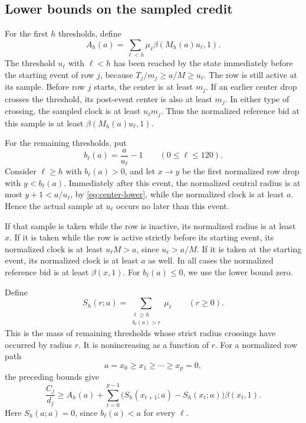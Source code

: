 \documentclass[11pt]{article}
\theoremstyle{definition}
\theoremstyle{remark}
\begin{document}
\subsection{Lower bounds on the sampled credit}

For the first $h$ thresholds, define
\begin{equation}\label{eq:active-credit}
  A_h(a)=\sum_{\ell<h}\mu_\ell\beta(M_h(a)u_\ell,1).
\end{equation}
The threshold $u_\ell$ with $\ell<h$ has been reached by the state
immediately before the starting event of row $j$, because
$T_j/m_j\ge a/M\ge u_\ell$.
The row is still active at its sample.
Before row $j$ starts, the center is at least $m_j$. If an earlier center drop
crosses the threshold, its post-event center is also at least $m_j$.
In either type of crossing, the sampled clock is at least $u_\ell m_j$.
Thus the normalized reference bid at this sample is at least
$\beta(M_h(a)u_\ell,1)$.

For the remaining thresholds, put
\begin{equation}\label{eq:threshold-radii}
  b_\ell(a)=\frac a{u_\ell}-1\qquad(0\le\ell\le120).
\end{equation}
Consider $\ell\ge h$ with $b_\ell(a)>0$, and let $x\longrightarrow y$ be the
first normalized row drop with $y<b_\ell(a)$.
Immediately after this event, the normalized central radius is at most
$y+1<a/u_\ell$, by \eqref{eq:center-lower}, while the normalized clock is
at least $a$. Hence the actual sample at $u_\ell$ occurs no later than this
event.

If that sample is taken while the row is inactive, its normalized radius is
at least $x$. If it is taken while the row is active strictly before
its starting event, its normalized clock is at least $u_\ell M>a$, since
$u_\ell>a/M$. If it is taken at the starting event, its normalized clock
is at least $a$ as well. In all cases the normalized reference bid is at
least $\beta(x,1)$. For $b_\ell(a)\le0$, we use the lower bound zero.

Define
\begin{equation}\label{eq:spent}
  S_h(r;a)=\sum_{\substack{\ell\ge h\\b_\ell(a)>r}}\mu_\ell
  \qquad(r\ge0).
\end{equation}
This is the mass of remaining thresholds whose strict radius crossings have
occurred by radius $r$. It is nonincreasing as a function of $r$.
For a normalized row path
\[
  a=x_0\ge x_1\ge\cdots\ge x_p=0,
\]
the preceding bounds give
\begin{equation}\label{eq:credit-lower}
  \frac{C_j}{d_j}\ge A_h(a)+
     \sum_{t=0}^{p-1}
        \bigl(S_h(x_{t+1};a)-S_h(x_t;a)\bigr)\beta(x_t,1).
\end{equation}
Here $S_h(a;a)=0$, since $b_\ell(a)<a$ for every $\ell$.
\end{document}

